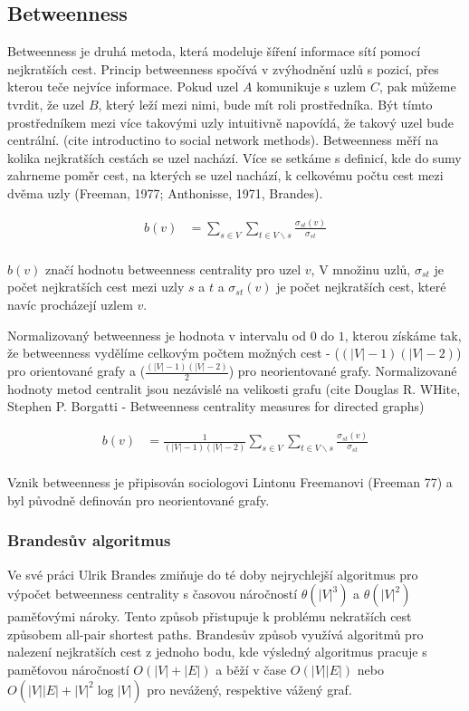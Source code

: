 \documentclass[12pt,titlepage]{report}
\begin{document}
\subsection{Betweenness}
Betweenness je druhá metoda, která modeluje šíření informace sítí pomocí
nejkratších cest. Princip betweenness spočívá v zvýhodnění uzlů s pozicí, přes
kterou teče nejvíce informace. Pokud uzel $A$ komunikuje s uzlem $C$, pak
můžeme tvrdit, že uzel $B$, který leží mezi nimi, bude mít roli prostředníka.
Být tímto prostředníkem mezi více takovými uzly intuitivně napovídá, že takový
uzel bude centrální.  (cite introductino to social network methods).
Betweenness měří na kolika nejkratších cestách se uzel nachází. Více se setkáme
s definicí, kde do sumy zahrneme poměr cest, na kterých se uzel nachází, k
celkovému počtu cest mezi dvěma uzly (Freeman, 1977; Anthonisse, 1971, Brandes).

\begin{align*}
b(v) &= \displaystyle\sum\limits_{s \in V} \displaystyle\sum\limits_{t \in V \backslash s} \frac{\sigma_{st}(v)}{\sigma_{st}} \\
\end{align*}

$b(v)$ značí hodnotu betweenness centrality pro uzel $v$, V množinu uzlů,
$\sigma_{st}$ je počet nejkratších cest mezi uzly $s$ a $t$ a $\sigma_{st}(v)$
je počet nejkratších cest, které navíc procházejí uzlem $v$.

Normalizovaný betweenness je hodnota v intervalu od $0$ do $1$, kterou získáme
tak, že betweenness vydělíme celkovým počtem možných cest - ($(|V| - 1)(|V| -
2)$) pro orientované grafy a ($\frac{(|V| - 1)(|V| - 2)}{2}$) pro neorientované
grafy. Normalizované hodnoty metod centralit jsou nezávislé na velikosti grafu
(cite Douglas R. WHite, Stephen P. Borgatti - Betweenness centrality measures
for directed graphs)

\begin{align*}
b(v) &= \frac{1}{(|V| - 1)(|V| - 2)} \displaystyle\sum\limits_{s \in V} \displaystyle\sum\limits_{t \in V \backslash s} \frac{\sigma_{st}(v)}{\sigma_{st}} \\
\end{align*}

Vznik betweenness je připisován sociologovi Lintonu Freemanovi (Freeman 77) a byl původně definován pro neorientované grafy.

\subsubsection{Brandesův algoritmus}
Ve své práci Ulrik Brandes zmiňuje do té doby nejrychlejší algoritmus pro
výpočet betweenness centrality s časovou náročností $\theta(|V|^3)$ a
$\theta(|V|^2)$ paměťovými nároky. Tento způsob přistupuje k problému
nekratších cest způsobem all-pair shortest paths. Brandesův způsob využívá
algoritmů pro nalezení nejkratších cest z jednoho bodu, kde výsledný algoritmus
pracuje s paměťovou náročností $O(|V| + |E|)$ a běží v čase $O(|V||E|)$ nebo
$O(|V||E| + |V|^2 \log|V|)$ pro nevážený, respektive vážený graf. 
\end{document}

